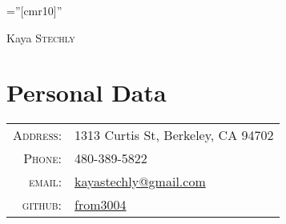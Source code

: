 \documentclass[a4paper,10pt]{article}
\begin{document}

\pagestyle{empty} %

\font\fb=''[cmr10]'' %

\par{\centering
		{\Huge Kaya \textsc{Stechly}
	}\bigskip\par}

\section{Personal Data}

\begin{tabular}{rl}
	\textsc{Address:}	& 1313 Curtis St, Berkeley, CA 94702 \\
	\textsc{Phone:}		& 480-389-5822\\
	\textsc{email:}		& \href{mailto:kayastechly@gmail.com}{kayastechly@gmail.com}\\
	\textsc{github:}	& \href{https://github.com/from3004}{from3004}\\
\end{tabular}

\end{document}
